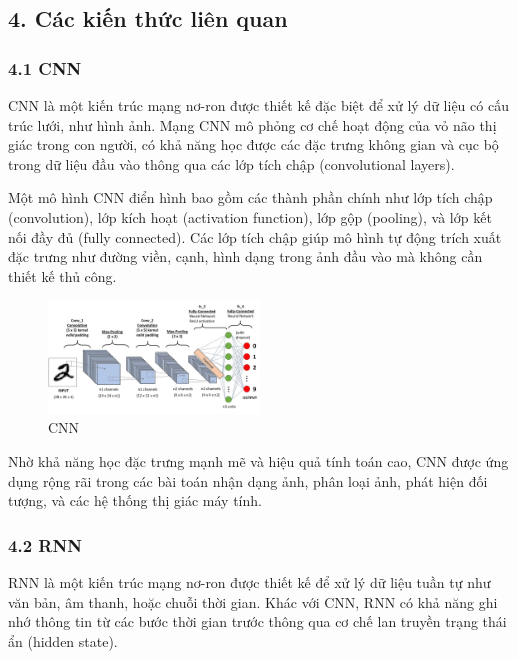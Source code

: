 \documentclass[../main.tex]{subfiles}
\begin{document}
\subsection*{4. Các kiến thức liên quan}

\subsubsection*{4.1 CNN}

CNN là một kiến trúc mạng nơ-ron được thiết kế đặc biệt để xử lý dữ liệu có cấu trúc lưới, như hình ảnh. Mạng CNN mô phỏng cơ chế hoạt động của vỏ não thị giác trong con người, có khả năng học được các đặc trưng không gian và cục bộ trong dữ liệu đầu vào thông qua các lớp tích chập (convolutional layers).

Một mô hình CNN điển hình bao gồm các thành phần chính như lớp tích chập (convolution), lớp kích hoạt (activation function), lớp gộp (pooling), và lớp kết nối đầy đủ (fully connected). Các lớp tích chập giúp mô hình tự động trích xuất đặc trưng như đường viền, cạnh, hình dạng trong ảnh đầu vào mà không cần thiết kế thủ công.
\begin{figure}[H]
    \centering
    \includegraphics[width=0.5\textwidth]{Image/CNN.png}
    \caption{CNN}
    \label{fig:CNN}
\end{figure}

Nhờ khả năng học đặc trưng mạnh mẽ và hiệu quả tính toán cao, CNN được ứng dụng rộng rãi trong các bài toán nhận dạng ảnh, phân loại ảnh, phát hiện đối tượng, và các hệ thống thị giác máy tính.

\subsubsection*{4.2 RNN}

RNN là một kiến trúc mạng nơ-ron được thiết kế để xử lý dữ liệu tuần tự như văn bản, âm thanh, hoặc chuỗi thời gian. Khác với CNN, RNN có khả năng ghi nhớ thông tin từ các bước thời gian trước thông qua cơ chế lan truyền trạng thái ẩn (hidden state).
\end{document}

